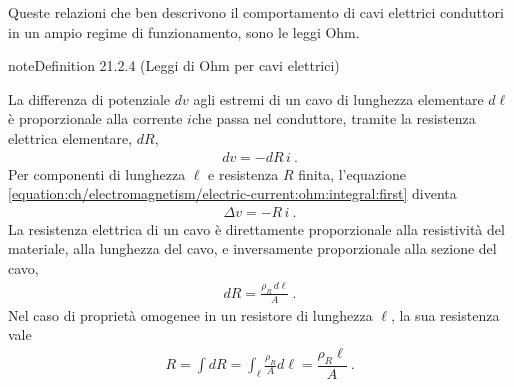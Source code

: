\documentclass[letterpaper,10pt,italian]{jupyterBook}
\begin{document}
\sphinxAtStartPar
Queste relazioni che ben descrivono il comportamento di cavi elettrici conduttori in un ampio regime di funzionamento, sono le leggi Ohm.
\label{ch/electromagnetism/electric-current:ohm-wire}
\begin{sphinxadmonition}{note}{Definition 21.2.4 (Leggi di Ohm per cavi elettrici)}



\sphinxAtStartPar
{} La differenza di potenziale \(dv\) agli estremi di un cavo di lunghezza elementare \(d \ell\) è proporzionale alla corrente \(i\)che passa nel conduttore, tramite la resistenza elettrica elementare, \(d R\),
\begin{equation}\label{equation:ch/electromagnetism/electric-current:ohm:integral:first}
\begin{split}dv = - dR \, i \ .\end{split}
\end{equation}
\sphinxAtStartPar
Per componenti di lunghezza \(\ell\) e resistenza \(R\) finita, l’equazione \eqref{equation:ch/electromagnetism/electric-current:ohm:integral:first} diventa
\begin{equation}\label{equation:ch/electromagnetism/electric-current:ohm:integral:first:R}
\begin{split}\Delta v = - R \, i \ .\end{split}
\end{equation}
\sphinxAtStartPar
{} La resistenza elettrica di un cavo è direttamente proporzionale alla resistività del materiale, alla lunghezza del cavo, e inversamente proporzionale alla sezione del cavo,
\begin{equation}\label{equation:ch/electromagnetism/electric-current:ohm:integral:second}
\begin{split}dR = \frac{\rho_R \, d\ell}{A} \ .\end{split}
\end{equation}
\sphinxAtStartPar
Nel caso di proprietà omogenee in un resistore di lunghezza \(\ell\), la sua resistenza vale
\begin{equation*}
\begin{split}R = \int d R = \int_{\ell} \frac{\rho_R}{A} d \ell = \dfrac{\rho_R \ell}{A} \ .\end{split}
\end{equation*}\end{sphinxadmonition}
\label{ch/electromagnetism/electric-current:resistance-temperature}
\end{document}
